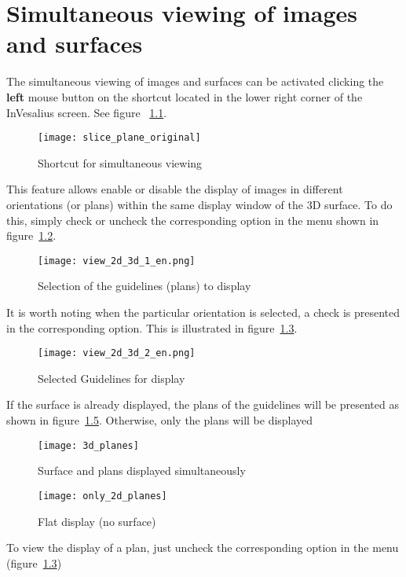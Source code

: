 \chapter{Simultaneous viewing of images and surfaces}

The simultaneous viewing of images and surfaces can be activated clicking the \textbf{left} mouse button on the shortcut located in the lower right corner of the InVesalius screen. See figure~ \ref{fig:slice_plane_original}.

\begin{figure}[!htb]
\centering
\texttt{[image: slice\_plane\_original]}
\caption{Shortcut for simultaneous viewing}
\label{fig:slice_plane_original}
\end{figure}

This feature allows enable or disable the display of images in different orientations (or plans) within the same display window of the 3D surface. To do this, simply check or uncheck the corresponding option in the menu shown in figure~\ref{fig:view_2d_3d_1}.

\begin{figure}[!htb]
\centering
\texttt{[image: view\_2d\_3d\_1\_en.png]}
\caption{Selection of the guidelines (plans) to display}
\label{fig:view_2d_3d_1}
\end{figure}

It is worth noting when the particular orientation is selected, a check is presented in the corresponding option. This is illustrated in figure~\ref{fig:view_2d_3d_2}.

\begin{figure}[!htb]
\centering
\texttt{[image: view\_2d\_3d\_2\_en.png]}
\caption{Selected Guidelines for display}
\label{fig:view_2d_3d_2}
\end{figure}

\newpage

If the surface is already displayed, the plans of the guidelines will be presented as shown in figure~\ref{fig:only_2d_planes}. Otherwise, only the plans will be displayed

\begin{figure}[!htb]
\centering
\texttt{[image: 3d\_planes]}
\caption{Surface and plans displayed simultaneously}
\label{fig:3d_planes}
\end{figure}

\begin{figure}[!htb]
\centering
\texttt{[image: only\_2d\_planes]}
\caption{Flat display (no surface)}
\label{fig:only_2d_planes}
\end{figure}

\newpage

To view the display of a plan, just uncheck the corresponding option in the menu (figure~\ref{fig:view_2d_3d_2})